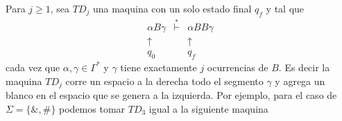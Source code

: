\begin{frame}
  Para $j\geq 1$, sea $TD_{j}$ una maquina con un solo estado final $q_{f}$ y
  tal que%
  \begin{equation*}
  \begin{array}{ccc}
  \alpha B\gamma  & \overset{\ast }{\vdash } & \alpha BB\gamma  \\
  \uparrow  &  & \uparrow \ \  \\
  q_{0} &  & q_{f}\ \
  \end{array}%
  \end{equation*}%
  cada vez que $\alpha ,\gamma \in \Gamma ^{\ast }$ y $\gamma $ tiene
  exactamente $j$ ocurrencias de $B$. Es decir la maquina $TD_{j}$ corre un
  espacio a la derecha todo el segmento $\gamma $ y agrega un blanco en el
  espacio que se genera a la izquierda. Por ejemplo, para el caso de $\Sigma
  =\{\&,\#\}$ podemos tomar $TD_{3}$ igual a la siguiente maquina
\end{frame}
